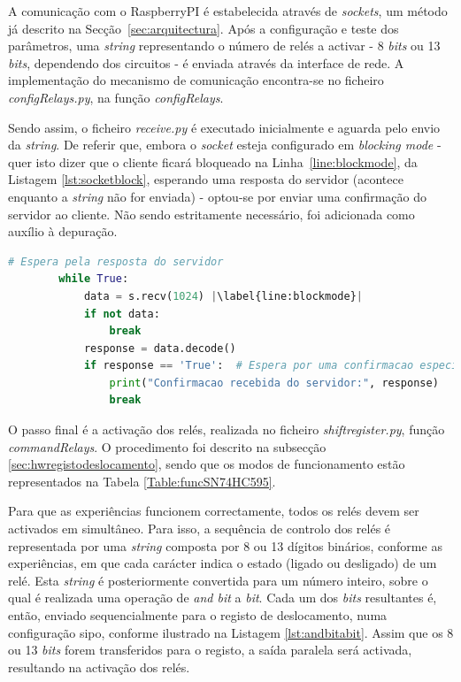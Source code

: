 A comunicação com o \gls{RaspberryPI} é estabelecida através de \textit{sockets}, um método já descrito na Secção~\ref{sec:arquitectura}. Após a configuração e teste dos parâmetros, uma \textit{string} representando o número de relés a activar - 8 \textit{bits} ou 13 \textit{bits}, dependendo dos circuitos - é enviada através da interface de rede. A implementação do mecanismo de comunicação encontra-se no ficheiro \textit{configRelays.py}, na função \textit{config\textunderscore Relays}.

Sendo assim, o ficheiro \textit{receive.py} é executado inicialmente e aguarda pelo envio da \textit{string}. De referir que, embora o \textit{socket} esteja configurado em \textit{blocking mode} - quer isto dizer que o cliente ficará bloqueado na Linha~\ref{line:blockmode}, da Listagem \ref{lst:socketblock}, esperando uma resposta do servidor \cite{Sockets} (acontece enquanto a \textit{string} não for enviada) - optou-se por enviar uma confirmação do servidor ao cliente. Não sendo estritamente necessário, foi adicionada como auxílio à depuração.

\begin{minipage}{0.9\linewidth}
	\begin{lstlisting}[language=Python,escapechar=|, caption=\textit{Block Mode \textins{Sockets} configRelays.py}, label=lst:socketblock]
		# Espera pela resposta do servidor
        while True:
            data = s.recv(1024) |\label{line:blockmode}|
            if not data:
                break
            response = data.decode()
            if response == 'True':  # Espera por uma confirmacao especifica do servidor
                print("Confirmacao recebida do servidor:", response)
                break
	\end{lstlisting}
\end{minipage}

O passo final é a activação dos relés, realizada no ficheiro \textit{shift\textunderscore register.py}, função \textit{commandRelays}. O procedimento foi descrito na subsecção \ref{sec:hwregistodeslocamento}, sendo que os modos de funcionamento estão representados na Tabela \ref{Table:funcSN74HC595}.

Para que as experiências funcionem correctamente, todos os relés devem ser activados em simultâneo. Para isso, a sequência de controlo dos relés é representada por uma \textit{string} composta por 8 ou 13 dígitos binários, conforme as experiências, em que cada carácter indica o estado (ligado ou desligado) de um relé. Esta \textit{string} é posteriormente convertida para um número inteiro, sobre o qual é realizada uma operação de \textit{and bit} a \textit{bit}. Cada um dos \textit{bits} resultantes é, então, enviado sequencialmente para o registo de deslocamento, numa configuração \acrshort{sipo}, conforme ilustrado na Listagem \ref{lst:andbitabit}. Assim que os 8 ou 13 \textit{bits} forem transferidos para o registo, a saída paralela será activada, resultando na activação dos relés.

